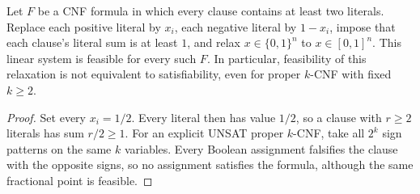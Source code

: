 \begin{proposition}
\label{prop:lp}
Let $F$ be a CNF formula in which every clause contains at least two
literals. Replace each positive literal by $x_i$, each negative literal by
$1-x_i$, impose that each clause's literal sum is at least $1$, and relax
$x\in\{0,1\}^n$ to $x\in[0,1]^n$. This linear system is feasible for every
such $F$. In particular, feasibility of this relaxation is not equivalent
to satisfiability, even for proper $k$-CNF with fixed $k\ge2$.
\end{proposition}
\begin{proof}
Set every $x_i=1/2$. Every literal then has value $1/2$, so a clause with
$r\ge2$ literals has sum $r/2\ge1$. For an explicit UNSAT proper $k$-CNF,
take all $2^k$ sign patterns on the same $k$ variables. Every Boolean
assignment falsifies the clause with the opposite signs, so no assignment
satisfies the formula, although the same fractional point is feasible.
\end{proof}
